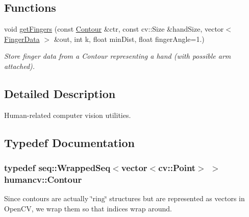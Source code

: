 \subsection*{Functions}
\begin{DoxyCompactItemize}
\item 
void \hyperlink{namespacehumancv_aa7c8371defc1384bddefbe8daba81ae9}{get\-Fingers} (const \hyperlink{namespacehumancv_ac3621cda88df26d2718f6bd5ec4de1dd}{Contour} \&ctr, const cv\-::\-Size \&hand\-Size, vector$<$ \hyperlink{structhumancv_1_1_finger_data}{Finger\-Data} $>$ \&out, int k, float min\-Dist, float finger\-Angle=1.)
\begin{DoxyCompactList}\small\item\em Store finger data from a {\ttfamily Contour} representing a hand (with possible arm attached). \end{DoxyCompactList}\end{DoxyCompactItemize}


\subsection{Detailed Description}
Human-\/related computer vision utilities. 

\subsection{Typedef Documentation}
\hypertarget{namespacehumancv_ac3621cda88df26d2718f6bd5ec4de1dd}{
\subsubsection[{Contour}]{\setlength{\rightskip}{0pt plus 5cm}typedef {\bf seq\-::\-Wrapped\-Seq}$<$vector$<$cv\-::\-Point$>$ $>$ {\bf humancv\-::\-Contour}}}\label{namespacehumancv_ac3621cda88df26d2718f6bd5ec4de1dd}


Since contours are actually \char`\"{}ring\char`\"{} structures but are represented as {\ttfamily vector}s in Open\-C\-V, we wrap them so that indices wrap around. 



